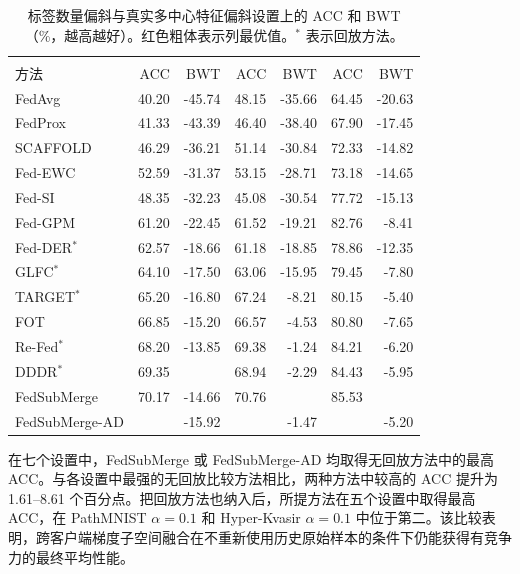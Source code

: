 \begin{table}[htbp]
\centering
\caption{标签数量偏斜与真实多中心特征偏斜设置上的 ACC 和 BWT（\%，越高越好）。红色粗体表示列最优值。$^{\ast}$ 表示回放方法。}
\label{tab:fedsubmerge-main-other}
\thesistablefont
\setlength{\tabcolsep}{3pt}
\renewcommand{\arraystretch}{1.10}
\begin{tabular}{lrrrrrr}
\toprule
&  &  &  \\
方法 & ACC & BWT & ACC & BWT & ACC & BWT \\
\midrule
FedAvg & 40.20 & -45.74 & 48.15 & -35.66 & 64.45 & -20.63 \\
FedProx & 41.33 & -43.39 & 46.40 & -38.40 & 67.90 & -17.45 \\
SCAFFOLD & 46.29 & -36.21 & 51.14 & -30.84 & 72.33 & -14.82 \\
Fed-EWC & 52.59 & -31.37 & 53.15 & -28.71 & 73.18 & -14.65 \\
Fed-SI & 48.35 & -32.23 & 45.08 & -30.54 & 77.72 & -15.13 \\
Fed-GPM & 61.20 & -22.45 & 61.52 & -19.21 & 82.76 & -8.41 \\
Fed-DER$^{\ast}$ & 62.57 & -18.66 & 61.18 & -18.85 & 78.86 & -12.35 \\
GLFC$^{\ast}$ & 64.10 & -17.50 & 63.06 & -15.95 & 79.45 & -7.80 \\
TARGET$^{\ast}$ & 65.20 & -16.80 & 67.24 & -8.21 & 80.15 & -5.40 \\
FOT & 66.85 & -15.20 & 66.57 & -4.53 & 80.80 & -7.65 \\
Re-Fed$^{\ast}$ & 68.20 & -13.85 & 69.38 & -1.24 & 84.21 & -6.20 \\
DDDR$^{\ast}$ & 69.35 &  & 68.94 & -2.29 & 84.43 & -5.95 \\
FedSubMerge & 70.17 & -14.66 & 70.76 &  & 85.53 &  \\
FedSubMerge-AD &  & -15.92 &  & -1.47 &  & -5.20 \\
\bottomrule
\end{tabular}%

\end{table}

在七个设置中，FedSubMerge 或 FedSubMerge-AD 均取得无回放方法中的最高 ACC。与各设置中最强的无回放比较方法相比，两种方法中较高的 ACC 提升为 1.61--8.61 个百分点。把回放方法也纳入后，所提方法在五个设置中取得最高 ACC，在 PathMNIST $\alpha=0.1$ 和 Hyper-Kvasir $\alpha=0.1$ 中位于第二。该比较表明，跨客户端梯度子空间融合在不重新使用历史原始样本的条件下仍能获得有竞争力的最终平均性能。

